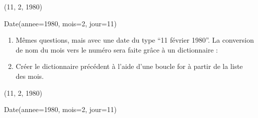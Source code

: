 \documentclass[letterpaper,10pt,english]{sphinxhowto}
\begin{document}
\begin{sphinxVerbatim}[commandchars=\\\{\}]
\end{sphinxVerbatim}

\begin{sphinxVerbatim}[commandchars=\\\{\}]
(11, 2, 1980)
\end{sphinxVerbatim}

\begin{sphinxVerbatim}[commandchars=\\\{\}]
Date(annee=1980, mois=2, jour=11)
\end{sphinxVerbatim}
\begin{enumerate}
%
\setcounter{enumi}{12}
\item {} 
\sphinxAtStartPar
Mêmes questions, mais avec une date du type “11 février 1980”. La conversion de nom du mois vers le numéro sera faite grâce à un dictionnaire : 

\item {} 
\sphinxAtStartPar
Créer le dictionnaire précédent à l’aide d’une boucle for à partir de la liste des mois.

\end{enumerate}

\begin{sphinxVerbatim}[commandchars=\\\{\}]
\end{sphinxVerbatim}

\begin{sphinxVerbatim}[commandchars=\\\{\}]
(11, 2, 1980)
\end{sphinxVerbatim}

\begin{sphinxVerbatim}[commandchars=\\\{\}]
Date(annee=1980, mois=2, jour=11)
\end{sphinxVerbatim}
\end{document}
